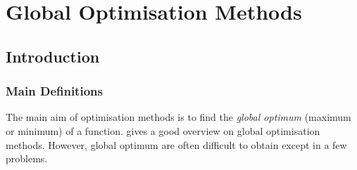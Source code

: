 
\chapter{Global Optimisation Methods}\label{Chapter:GlobalOpt}


\section{Introduction}\label{Chapter:GlobalOpt:Section:Introduction}

\subsection{Main Definitions}\label{Chapter:GlobalOpt:Section:Definitions}
The main aim of optimisation methods is to find the {\it global optimum} (maximum or minimum) of a function. \citet{Pardalos_2000} \citep[see also][]{Piro_2016} gives a good overview on global optimisation methods. However, global optimum are often difficult to obtain except in a few problems. 

